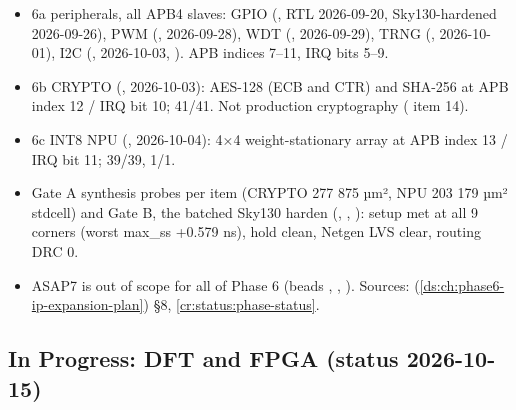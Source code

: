 \begin{record}

\begin{itemize}
\tightlist
\item
  \ok{} 6a peripherals, all APB4 slaves: GPIO (, RTL
  2026-09-20, Sky130-hardened 2026-09-26), PWM (,
  2026-09-28), WDT (, 2026-09-29), TRNG (,
  2026-10-01), I2C (, 2026-10-03, ). APB indices
  7--11, IRQ bits 5--9.
\item
  \ok{} 6b CRYPTO (, 2026-10-03): AES-128 (ECB and CTR)
  and SHA-256 at APB index 12 / IRQ bit 10;  41/41.
  Not production cryptography ( item 14).
\item
  \ok{} 6c INT8 NPU (, 2026-10-04): 4×4 weight-stationary
  array at APB index 13 / IRQ bit 11;  39/39,
   1/1.
\item
  \ok{} Gate A synthesis probes per item (CRYPTO 277 875 µm², NPU 203
  179 µm² stdcell) and Gate B, the batched Sky130 harden
  (, , ): setup met
  at all 9 corners (worst max\_ss +0.579 ns), hold clean, Netgen LVS
  clear, routing DRC 0.
\item
  ASAP7 is out of scope for all of Phase 6 (beads ,
  , ). Sources:
   (\cref{ds:ch:phase6-ip-expansion-plan}) §8, \cref{cr:status:phase-status}.
\end{itemize}

\end{record}

\subsection{In Progress: DFT and FPGA (status 2026-10-15)}\label{cr:status:phase-history:in-progress-dft-and-fpga-status-2026-10-15}


